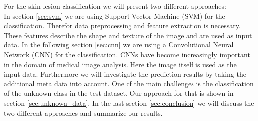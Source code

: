 For the skin lesion classification we will present two different approaches: \\
In section \ref{sec:svm} we are using Support Vector Machine (SVM) for the classification. Therefor data preprocessing and feature extraction is necessary. These features describe the shape and texture of the image and are used as input data.
In the following section \ref{sec:cnn} we are using a Convolutional Neural Network (CNN) for the classification. CNNs have become increasingly important in the domain of medical image analysis. Here the image itself is used as the input data. 
Furthermore we will investigate the prediction results by taking the additional meta data into account. 
One of the main challenges is the classification of the unknown class in the test dataset. Our approach for that is shown in section \ref{sec:unknown_data}.
In the last section \ref{sec:conclusion} we will discuss the two different approaches and summarize our results.
